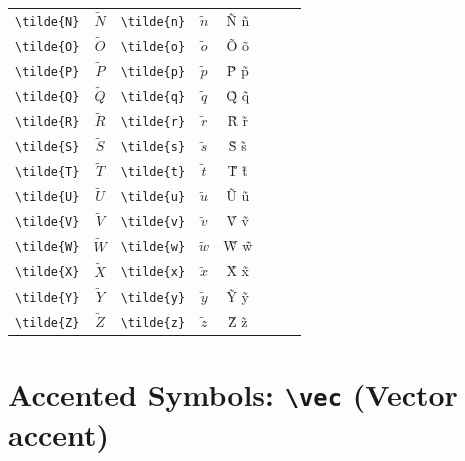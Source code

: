 \documentclass[12pt,a4paper]{article}
\begin{document}
\begin{longtable}{|l|c|l|c|c|l|c|c|}
\verb|\tilde{N}| & $\tilde{N}$     & \verb|\tilde{n}| & $\tilde{n}$     & Ñ ñ            &                  &                 & \\
\verb|\tilde{O}| & $\tilde{O}$     & \verb|\tilde{o}| & $\tilde{o}$     & Õ õ            &                  &                 & \\
\verb|\tilde{P}| & $\tilde{P}$     & \verb|\tilde{p}| & $\tilde{p}$     & P̃ p̃            &                  &                 & \\
\verb|\tilde{Q}| & $\tilde{Q}$     & \verb|\tilde{q}| & $\tilde{q}$     & Q̃ q̃            &                  &                 & \\
\verb|\tilde{R}| & $\tilde{R}$     & \verb|\tilde{r}| & $\tilde{r}$     & R̃ r̃            &                  &                 & \\
\verb|\tilde{S}| & $\tilde{S}$     & \verb|\tilde{s}| & $\tilde{s}$     & S̃ s̃            &                  &                 & \\
\verb|\tilde{T}| & $\tilde{T}$     & \verb|\tilde{t}| & $\tilde{t}$     & T̃ t̃            &                  &                 & \\
\verb|\tilde{U}| & $\tilde{U}$     & \verb|\tilde{u}| & $\tilde{u}$     & Ũ ũ            &                  &                 & \\
\verb|\tilde{V}| & $\tilde{V}$     & \verb|\tilde{v}| & $\tilde{v}$     & Ṽ ṽ            &                  &                 & \\
\verb|\tilde{W}| & $\tilde{W}$     & \verb|\tilde{w}| & $\tilde{w}$     & W̃ w̃            &                  &                 & \\
\verb|\tilde{X}| & $\tilde{X}$     & \verb|\tilde{x}| & $\tilde{x}$     & X̃ x̃            &                  &                 & \\
\verb|\tilde{Y}| & $\tilde{Y}$     & \verb|\tilde{y}| & $\tilde{y}$     & Ỹ ỹ            &                  &                 & \\
\verb|\tilde{Z}| & $\tilde{Z}$     & \verb|\tilde{z}| & $\tilde{z}$     & Z̃ z̃            &                  &                 & \\
\hline
\end{longtable}

\newpage

\section*{Accented Symbols: \texttt{\textbackslash vec} (Vector accent)}
\end{document}
